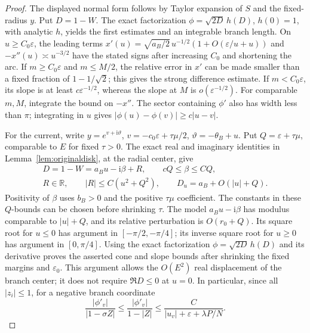 \documentclass[11pt]{article}
\numberwithin{equation}{section}
\theoremstyle{definition}
\newcommand{\ii}{\mathrm i}
\newcommand{\R}{\mathbb R}
\newcommand{\eps}{\varepsilon}
\begin{document}
\begin{proof}
The displayed normal form follows by Taylor expansion of \(S\) and
the fixed-radius \(y\). Put \(D=1-W\).
The exact factorization \(\phi=\sqrt{2D}\,h(D)\), \(h(0)=1\),
with analytic \(h\), yields the first estimates and an integrable
branch length. On \(u\ge C_0\eps\), the leading terms
\(x'(u)=\sqrt{a_B/2}\,u^{-1/2}(1+O(\eps/u+u))\) and
\(-x''(u)\asymp u^{-3/2}\) have the stated signs after increasing
\(C_0\) and shortening the arc.
If \(m\ge C_0\eps\) and \(m\le M/2\), the relative error in
\(x'\) can be made smaller than a fixed fraction of
\(1-1/\sqrt2\); this gives the strong difference estimate.
If \(m<C_0\eps\), its slope is at least \(c\eps^{-1/2}\),
whereas the slope at \(M\) is \(o(\eps^{-1/2})\).
For comparable \(m,M\), integrate the bound on \(-x''\).
The sector containing \(\phi'\) also has width less than \(\pi\);
integrating in \(u\) gives
\(|\phi(u)-\phi(v)|\ge c|u-v|\).

For the current, write \(y=e^{v+\ii\vartheta}\),
\(v=-c_0\eps+\tau \mu/2\), \(\vartheta=-\theta_B+u\).
Put \(Q=\eps+\tau \mu\), comparable to \(E\) for fixed \(\tau>0\).
The exact real and imaginary identities in
Lemma~\ref{lem:originaldisk}, at the radial center, give
\begin{gather*}
 D=1-W=a_Bu-\ii\beta+R,\qquad cQ\le\beta\le CQ,\\
 R\in\R,\qquad |R|\le C(u^2+Q^2),\qquad
 D_u=a_B+O(|u|+Q).
\end{gather*}
Positivity of \(\beta\) uses \(b_B>0\) and the positive
\(\tau \mu\) coefficient. The constants in these \(Q\)-bounds
can be chosen before shrinking \(\tau\). The model
\(a_Bu-\ii\beta\) has modulus comparable to \(|u|+Q\), and
its relative perturbation is \(O(r_0+Q)\). Its square root for \(u\le0\) has argument
in \([-\pi/2,-\pi/4]\); its inverse square root for \(u\ge0\)
has argument in \([0,\pi/4]\). Using the exact factorization
\(\phi=\sqrt{2D}\,h(D)\) and its derivative proves the asserted
cone and slope bounds after shrinking the fixed margins and
\(\eps_0\). This argument allows the \(O(E^2)\) real displacement
of the branch center; it does not require \(\Re D\le0\) at \(u=0\).
In particular, since all \(|z_i|\le1\), for a negative branch
coordinate
\[
 \frac{|\phi'_v|}{|1-\sigma Z|}
 \le\frac{|\phi'_v|}{1-|Z|}
 \le\frac C{|u_v|+\eps+\lambda P/N}.
\]
\end{proof}
\end{document}
